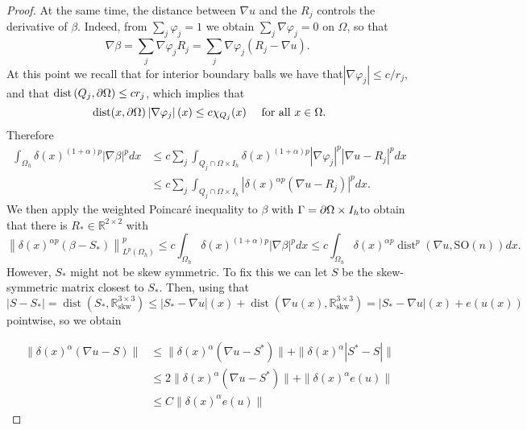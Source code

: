 \begin{proof}
At the same time, the distance between $\nabla u$ and the $R_j$ controls the derivative of $\beta$. Indeed, from $\sum_j \varphi_j=1$ we obtain $\sum_j \nabla \varphi_j=0$ on $\Omega$, so that
$$
\nabla \beta=\sum_j \nabla \varphi_j R_j=\sum_j \nabla \varphi_j\left(R_j-\nabla u\right) \text {. }
$$
At this point we recall that for interior boundary balls we have that$\left|\nabla \varphi_j\right| \leq c / r_j$, and that $\operatorname{dist}\left(Q_j, \partial\Omega\right) \leq c r_j$, which implies that
$$
\operatorname{dist}(x, \partial\Omega)\left|\nabla \varphi_j\right|(x) \leq c \chi_{Q_j}(x) \quad \text { for all } x \in \Omega .
$$
Therefore
$$
\begin{aligned}
\int_{\Omega_h} \delta(x)^{(1+\alpha)p}|\nabla \beta|^p d x & \leq c \sum_j \int_{Q_j\cap \Omega \times I_h} \delta(x)^{(1+\alpha)p}\left|\nabla \varphi_j\right|^p\left|\nabla u-R_j\right|^p d x \\
& \leq c \sum_j \int_{Q_j\cap \Omega \times I_h}\left|\delta(x)^{\alpha p}(\nabla u-R_j)\right|^p d x .
\end{aligned}
$$
We then apply the weighted Poincaré  inequality to $\beta$ with $\Gamma=\partial\Omega\times I_h$to obtain that there is $R_* \in \mathbb{R}^{2 \times 2}$ with
$$
\left\|\delta(x)^{\alpha p}(\beta-S_*)\right\|_{L^p(\Omega_h)}^p \leq c \int_{\Omega_h} \delta(x)^{(1+\alpha) p}|\nabla \beta|^p d x \leq c \int_{\Omega_h} \delta(x)^{\alpha p}\operatorname{dist}^p(\nabla u, \mathrm{SO}(n)) d x .
$$
However, $S_*$ might not be skew symmetric. To fix this we can let $S$ be the skew-symmetric matrix closest to $S_*$. Then, using that $\left|S-S_*\right|= \operatorname{dist}\left(S_*, \mathbb{R}_{\mathrm{skw}}^{3 \times 3}\right) \leq\left|S_*-\nabla u\right|(x)+\operatorname{dist}(\nabla u(x), \mathbb{R}_{\mathrm{skw}}^{3 \times 3})=\left|S_*-\nabla u\right|(x)+e(u(x))$ pointwise, so  we obtain

\begin{align*}
\|\delta(x)^\alpha(\nabla u-S)\|&\leq \|\delta(x)^\alpha(\nabla u-S^*)\|+\|\delta(x)^\alpha|S^*-S|\|\\
&\leq 2\|\delta(x)^\alpha(\nabla u-S^*)\| +\|\delta(x)^\alpha e(u)\|\\ 
&\leq C \|\delta(x)^\alpha e(u)\|
\end{align*}
\end{proof}
